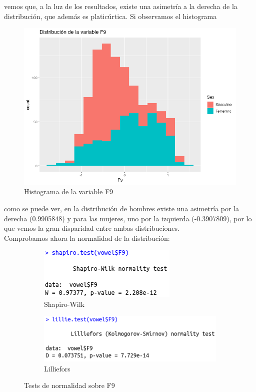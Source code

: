 vemos que, a la luz de los resultados, existe una asimetría a la derecha de la distribución, que además es platicúrtica. Si observamos el histograma

\begin{figure}[H] %
	\centering
	\includegraphics[scale=0.6]{dist-F9.png}  %
	\caption{Histograma de la variable F9} 
	\label{fig:hist-F9}
\end{figure}

como se puede ver, en la distribución de hombres existe una asimetría por la derecha (0.9905848) y para las mujeres, uno por la izquierda (-0.3907809), por lo que vemos la gran disparidad entre ambas distribuciones. \\

Comprobamos ahora la normalidad de la distribución:

\begin{figure}[H]
	\centering
	\begin{subfigure}{.5\textwidth}
		\centering
		\includegraphics[width=.7\linewidth]{sw-F9.png}
		\caption{Shapiro-Wilk}
		\label{fig:sw-F9}
	\end{subfigure}%
	\begin{subfigure}{.5\textwidth}
		\centering
		\includegraphics[width=.7\linewidth]{l-F9.png}
		\caption{Lilliefors}
		\label{fig:l-F9}
	\end{subfigure}
	\caption{Tests de normalidad sobre F9}
	\label{fig:normF9}
\end{figure}


